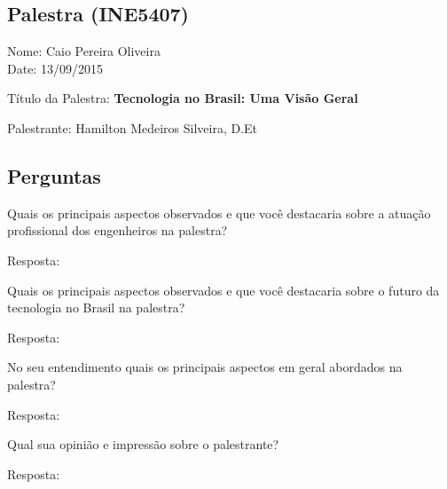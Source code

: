 \documentclass{article}
\begin{document}
\begin{center}
\section*{Palestra (INE5407)}

Nome: Caio Pereira Oliveira
\\Date: 13/09/2015

Título da Palestra: {\bf Tecnologia no Brasil: Uma Visão Geral}

Palestrante: Hamilton Medeiros Silveira, D.Et



\subsection*{Perguntas}

\end{center}

\begin{enumerate} %

{\bf \item Quais os principais aspectos observados e que você destacaria sobre a atuação profissional dos engenheiros na palestra?}

Resposta: 

{\bf \item Quais os principais aspectos observados e que você destacaria sobre o futuro da tecnologia no Brasil na palestra?}

Resposta: 

{\bf \item No seu entendimento quais os principais aspectos em geral abordados na palestra?}

Resposta: 

{\bf \item Qual sua opinião e impressão sobre o palestrante?}

Resposta: 

\end{enumerate}
\end{document}
